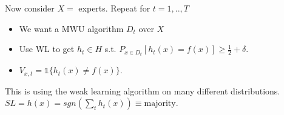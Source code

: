 Now consider $X = $ experts. 
Repeat for $t=1,..,T$
\begin{itemize}
\item We want a MWU algorithm $D_{t}$ over $X$
\item Use WL to get $h_{t} \in H$ s.t. $P_{x \in D_{t}}[ h_{t}(x) = f(x)] \geq \frac{1}{2} + \delta$.
\item $V_{x,t} = \mathbb{1}\{h_{t}(x) \neq f(x)\}$.
\end{itemize}
This is using the weak learning algorithm on many different distributions.
$SL = h(x) = sgn(\sum_{t} h_{t}(x)) \equiv \mbox{majority}$.


